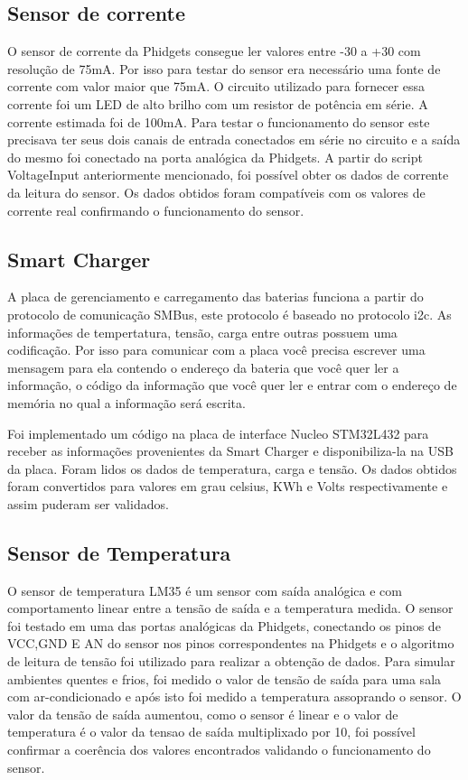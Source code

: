     \subsection{Sensor de corrente}
    
    O sensor de corrente da Phidgets consegue ler valores entre -30 a +30 com resolução de 75mA. Por isso para testar do sensor era necessário uma fonte de corrente com valor maior que 75mA. O circuito utilizado para fornecer essa corrente foi um LED de alto brilho com um resistor de potência em série. A corrente estimada foi de 100mA. Para testar o funcionamento do sensor este precisava ter seus dois canais de entrada conectados em série no circuito e a saída do mesmo foi conectado na porta analógica da Phidgets. A partir do script VoltageInput anteriormente mencionado, foi possível obter os dados de corrente da leitura do sensor. Os dados obtidos foram compatíveis com os valores de corrente real confirmando o funcionamento do sensor. 
    

    \subsection{Smart Charger}
    
    A placa de gerenciamento e carregamento das baterias funciona a partir do protocolo de comunicação SMBus, este protocolo é baseado no protocolo i2c. As informações de tempertatura, tensão, carga entre outras possuem uma codificação. Por isso para comunicar com a placa você precisa escrever uma mensagem para ela contendo o endereço da bateria que você quer ler a informação, o código da informação que você quer ler e entrar com o endereço de memória no qual a informação será escrita.
    
    Foi implementado um código na placa de interface Nucleo STM32L432 para receber as informações provenientes da Smart Charger e disponibiliza-la na USB da placa. Foram lidos os dados de temperatura, carga e tensão. Os dados obtidos foram convertidos para valores em grau celsius, KWh e Volts respectivamente e assim puderam ser validados. 

    \subsection{Sensor de Temperatura }
    
    O sensor de temperatura LM35 é um sensor com saída analógica e com comportamento linear entre a tensão de saída e a temperatura medida. O sensor foi testado em uma das portas analógicas da Phidgets, conectando os pinos de VCC,GND E AN do sensor nos pinos correspondentes na Phidgets e o algoritmo de leitura de tensão foi utilizado para realizar a obtenção de dados. Para simular ambientes quentes e frios, foi medido o valor de tensão de saída para uma sala com ar-condicionado e após isto foi medido a temperatura assoprando o sensor. O valor da tensão de saída aumentou, como o sensor é linear e o valor de temperatura é o valor da tensao de saída multiplixado por 10, foi possível confirmar a coerência dos valores encontrados validando o funcionamento do sensor.
